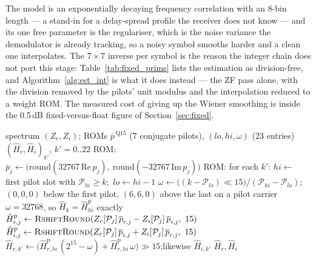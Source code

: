 The model is an exponentially decaying frequency correlation with an
8-bin length --- a stand-in for a delay-spread profile the receiver
does not know --- and its one free parameter is the regulariser, which
is the noise variance the demodulator is already tracking, so a noisy
symbol smooths harder and a clean one interpolates.  The
$7 \times 7$ inverse per symbol is the reason the integer chain does
not port this stage: Table~\ref{tab:fixed_prims} lists the estimation
as division-free, and Algorithm~\ref{alg:est_int} is what it does
instead --- the ZF pass alone, with the division removed by the
pilots' unit modulus and the interpolation reduced to a weight ROM.
The measured cost of giving up the Wiener smoothing is inside the
0.5\,dB fixed-versus-float figure of Section~\ref{sec:fixed}.

\begin{algorithm}[H]
\caption{Integer channel estimate (\texttt{FixedReceiver}, \texttt{rx\_demod.c}), per symbol.}
\label{alg:est_int}
\begin{algorithmic}[1]
\Require spectrum $(Z_r, Z_i)$; ROMs $\overline{p}^{\,\mathrm{Q15}}$ (7 conjugate pilots), $(lo, hi, \omega)$ (23 entries)
\Ensure $(\hat H_r, \hat H_i)_{k'}$, $k' = 0..22$
\State ROM: $\overline{p}_j \gets \big(\mathrm{round}(32767\, \mathrm{Re}\, p_j),\ \mathrm{round}(-32767\, \mathrm{Im}\, p_j)\big)$ 
\State ROM: for each $k'$: $hi \gets$ first pilot slot with $\mathcal{P}_{hi} \ge k$;\ $lo \gets hi - 1$ 
\Statex \hspace{\algorithmicindent} $\omega \gets \big((k - \mathcal{P}_{lo}) \ll 15\big) / (\mathcal{P}_{hi} - \mathcal{P}_{lo})$;\ $(0,0,0)$ below the first pilot, $(6,6,0)$ above the last
\Statex \hspace{\algorithmicindent} on a pilot carrier $\omega = 32768$, so $\hat H_k = \hat H^{\mathrm{p}}_{hi}$ exactly
 
    \State $\hat H^{\mathrm{p}}_{r,j} \gets \textsc{RshiftRound}(Z_r[\mathcal{P}_j]\, \overline{p}_{r,j} - Z_i[\mathcal{P}_j]\, \overline{p}_{i,j},\ 15)$
    \State $\hat H^{\mathrm{p}}_{i,j} \gets \textsc{RshiftRound}(Z_r[\mathcal{P}_j]\, \overline{p}_{i,j} + Z_i[\mathcal{P}_j]\, \overline{p}_{r,j},\ 15)$
\EndFor
{} 
    \State $\hat H_{r,k'} \gets \big(\hat H^{\mathrm{p}}_{r,lo}\,(2^{15} - \omega) + \hat H^{\mathrm{p}}_{r,hi}\,\omega\big) \gg 15$;\quad likewise $\hat H_{i,k'}$
\EndFor
\State \Return $\hat H_r, \hat H_i$
\end{algorithmic}
\end{algorithm}

